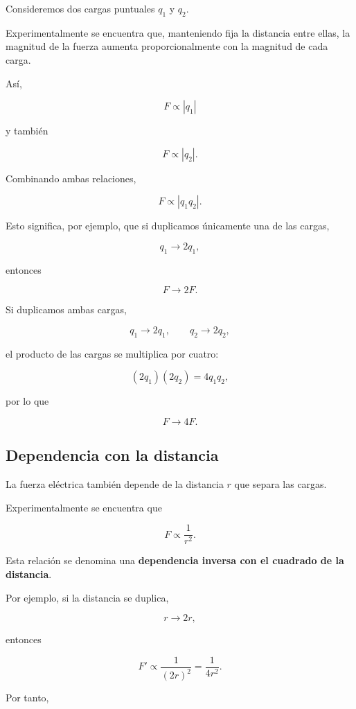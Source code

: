 Consideremos dos cargas puntuales \(q_1\) y \(q_2\).

Experimentalmente se encuentra que, manteniendo fija la distancia entre
ellas, la magnitud de la fuerza aumenta proporcionalmente con la magnitud de
cada carga.

Así,

\[
F\propto |q_1|
\]

y también

\[
F\propto |q_2|.
\]

Combinando ambas relaciones,

\[
F\propto |q_1q_2|.
\]

Esto significa, por ejemplo, que si duplicamos únicamente una de las cargas,

\[
q_1\longrightarrow2q_1,
\]

entonces

\[
F\longrightarrow2F.
\]

Si duplicamos ambas cargas,

\[
q_1\longrightarrow2q_1,
\qquad
q_2\longrightarrow2q_2,
\]

el producto de las cargas se multiplica por cuatro:

\[
(2q_1)(2q_2)=4q_1q_2,
\]

por lo que

\[
\boxed{
F\longrightarrow4F
}.
\]



\subsection{Dependencia con la distancia}

La fuerza eléctrica también depende de la distancia \(r\) que separa las
cargas.

Experimentalmente se encuentra que

\[
F\propto\frac{1}{r^2}.
\]

Esta relación se denomina una
\textbf{dependencia inversa con el cuadrado de la distancia}.

Por ejemplo, si la distancia se duplica,

\[
r\longrightarrow2r,
\]

entonces

\[
F'
\propto
\frac{1}{(2r)^2}
=
\frac{1}{4r^2}.
\]

Por tanto,

